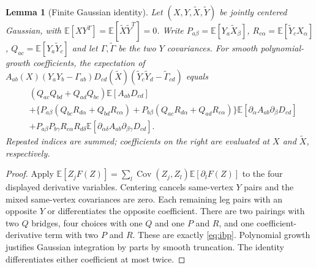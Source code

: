 \documentclass[11pt]{article}
\newtheorem{lemma}[theorem]{Lemma}
\newcommand{\E}{\mathbb E}
\begin{document}
\begin{lemma}[Finite Gaussian identity]\label{lem:ibp}
Let $(X,Y,\widetilde X,\widetilde Y)$ be jointly centered Gaussian, with
$\E[XY^T]=\E[\widetilde X\widetilde Y^T]=0$.
Write $P_{a\beta}=\E[Y_a\widetilde X_\beta]$,
$R_{c\alpha}=\E[\widetilde Y_cX_\alpha]$,
$Q_{ac}=\E[Y_a\widetilde Y_c]$ and let $\Gamma,\widetilde\Gamma$
be the two $Y$ covariances. For smooth polynomial-growth coefficients,
the expectation of
$A_{ab}(X)(Y_aY_b-\Gamma_{ab})D_{cd}(\widetilde X)
(\widetilde Y_c\widetilde Y_d-\widetilde\Gamma_{cd})$ equals
\begin{align}\label{eq:ibp}
 &(Q_{ac}Q_{bd}+Q_{ad}Q_{bc})\E[A_{ab}D_{cd}]\nonumber\\
 &+\{P_{a\beta}(Q_{bc}R_{d\alpha}+Q_{bd}R_{c\alpha})
       +P_{b\beta}(Q_{ac}R_{d\alpha}+Q_{ad}R_{c\alpha})\}
       \E[\partial_\alpha A_{ab}\partial_\beta D_{cd}]\nonumber\\
 &+P_{a\beta}P_{b\gamma}R_{c\alpha}R_{d\delta}
       \E[\partial_{\alpha\delta}A_{ab}\partial_{\beta\gamma}D_{cd}].
\end{align}
Repeated indices are summed; coefficients on the right are evaluated at
$X$ and $\widetilde X$, respectively.
\end{lemma}
\begin{proof}
Apply $\E[Z_jF(Z)]=\sum_l\operatorname{Cov}(Z_j,Z_l)\E[\partial_lF(Z)]$
to the four displayed derivative variables. Centering cancels same-vertex
$Y$ pairs and the mixed same-vertex covariances are zero. Each remaining
leg pairs with an opposite $Y$ or differentiates the opposite coefficient.
There are two pairings with two $Q$ bridges, four choices with one $Q$ and
one $P$ and $R$, and one coefficient-derivative term with two $P$ and $R$.
These are exactly \eqref{eq:ibp}. Polynomial growth justifies Gaussian
integration by parts by smooth truncation. The identity differentiates
either coefficient at most twice.
\end{proof}
\end{document}
